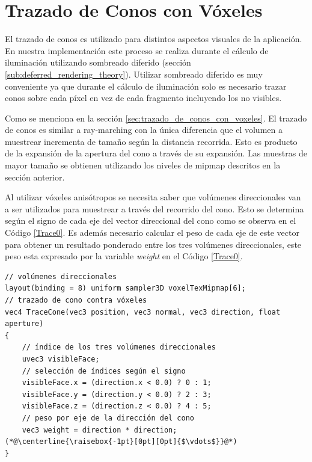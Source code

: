 \section{Trazado de Conos con Vóxeles} %
\label{sec:trazado_de_conos}
El trazado de conos es utilizado para distintos aspectos visuales de la aplicación. En nuestra implementación este proceso se realiza durante el cálculo de iluminación utilizando sombreado diferido (sección \ref{sub:deferred_rendering_theory}). Utilizar sombreado diferido es muy conveniente ya que durante el cálculo de iluminación solo es necesario trazar conos sobre cada píxel en vez de cada fragmento incluyendo los no visibles.

Como se menciona en la sección \ref{sec:trazado_de_conos_con_voxeles}. El trazado de conos es similar a ray-marching con la única diferencia que el volumen a muestrear incrementa de tamaño según la distancia recorrida. Esto es producto de la expansión de la apertura del cono a través de su expansión. Las muestras de mayor tamaño se obtienen utilizando los niveles de mipmap descritos en la sección anterior.

Al utilizar vóxeles anisótropos se necesita saber que volúmenes direccionales van a ser utilizados para muestrear a través del recorrido del cono. Esto se determina según el signo de cada eje del vector direccional del cono como se observa en el Código \ref{Trace0}. Es además necesario calcular el peso de cada eje de este vector para obtener un resultado ponderado entre los tres volúmenes direccionales, este peso esta expresado por la variable \emph{weight} en el Código \ref{Trace0}.
\\
\begin{lstlisting}[caption={Lógica para determinar volúmenes direccionales a utilizar durante el trazado de conos y peso por eje.}, label=Trace0]
// volúmenes direccionales
layout(binding = 8) uniform sampler3D voxelTexMipmap[6];
// trazado de cono contra vóxeles
vec4 TraceCone(vec3 position, vec3 normal, vec3 direction, float aperture)
{
    // índice de los tres volúmenes direccionales
    uvec3 visibleFace;
    // selección de índices según el signo
    visibleFace.x = (direction.x < 0.0) ? 0 : 1;
    visibleFace.y = (direction.y < 0.0) ? 2 : 3;
    visibleFace.z = (direction.z < 0.0) ? 4 : 5;
    // peso por eje de la dirección del cono
    vec3 weight = direction * direction;
(*@\centerline{\raisebox{-1pt}[0pt][0pt]{$\vdots$}}@*)
}
\end{lstlisting}

